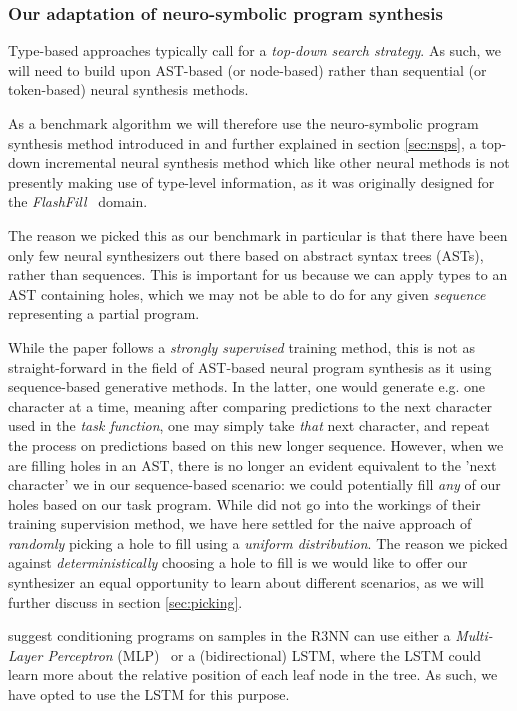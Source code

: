 \documentclass{article}
\begin{document}
\subsubsection{Our adaptation of neuro-symbolic program synthesis} \label{sec:ournsps}

Type-based approaches typically call for a \emph{top-down search strategy}.
As such, we will need to build upon AST-based (or node-based) rather than sequential (or token-based) neural synthesis methods.

As a benchmark algorithm we will therefore use the neuro-symbolic program synthesis method introduced in \citet{nsps} and further explained in section \ref{sec:nsps},
a top-down incremental neural synthesis method which like other neural methods is not presently making use of type-level information,
as it was originally designed for the \emph{FlashFill}~\citep{prose} domain.

The reason we picked this as our benchmark in particular is that there have been only few neural synthesizers out there based on abstract syntax trees (ASTs), rather than sequences.
This is important for us because we can apply types to an AST containing holes,
which we may not be able to do for any given \emph{sequence} representing a partial program.

While the paper follows a \emph{strongly supervised} training method,
this is not as straight-forward in the field of AST-based neural program synthesis as it using sequence-based generative methods.
In the latter, one would generate e.g. one character at a time,
meaning after comparing predictions to the next character used in the \emph{task function},
one may simply take \emph{that} next character,
and repeat the process on predictions based on this new longer sequence.
However, when we are filling holes in an AST,
there is no longer an evident equivalent to the 'next character' we in our sequence-based scenario:
we could potentially fill \emph{any} of our holes based on our task program.
While \citet{nsps} did not go into the workings of their training supervision method,
we have here settled for the naive approach of \emph{randomly} picking a hole to fill using a \emph{uniform distribution}.
The reason we picked against \emph{deterministically} choosing a hole to fill is
we would like to offer our synthesizer an equal opportunity to learn about different scenarios,
as we will further discuss in section \ref{sec:picking}.

\citet{nsps} suggest conditioning programs on samples in the R3NN can use either a
\emph{Multi-Layer Perceptron} (MLP)~\citep{rosenblatt1961principles} or a (bidirectional) LSTM,
where the LSTM could learn more about the relative position of each leaf node in the tree.
As such, we have opted to use the LSTM for this purpose.
\end{document}
